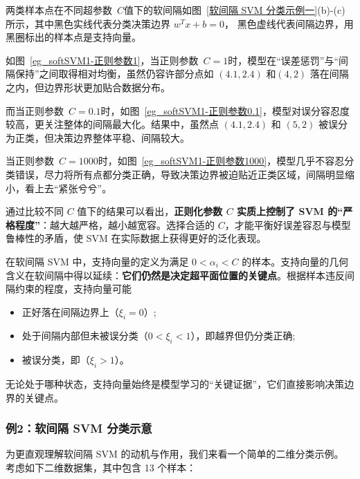 {两类样本点在不同超参数~$C$值下的软间隔如图~\ref{软间隔 SVM 分类示例一}(b)-(c)所示，其中黑色实线代表分类决策边界 $w^T x + b = 0$， 黑色虚线代表间隔边界，用黑圈标出的样本点是支持向量。

如图~\ref{eg_softSVM1-正则参数1}，当正则参数~$C=1$时，模型在“误差惩罚”与“间隔保持”之间取得相对均衡，虽然仍容许部分点如 $(4.1, 2.4)$ 和$(4, 2)$ 落在间隔之内，但边界形状更加贴合数据分布。
    
而当正则参数~$C=0.1$时，如图~\ref{eg_softSVM1-正则参数0.1}，模型对误分容忍度较高，更关注整体的间隔最大化。结果中，虽然点 $(4.1, 2.4)$ 和 $(5, 2)$ 被误分为正类，但决策边界整体平稳、间隔较大。

当正则参数~$C=1000$时，如图~\ref{eg_softSVM1-正则参数1000}，模型几乎不容忍分类错误，尽力将所有点都分类正确，导致决策边界被迫贴近正类区域，间隔明显缩小，看上去“紧张兮兮”。

通过比较不同 $C$ 值下的结果可以看出，\textbf{正则化参数 $C$ 实质上控制了 SVM 的“严格程度”}：越大越严格，越小越宽容。选择合适的 $C$，才能平衡好误差容忍与模型鲁棒性的矛盾，使 SVM 在实际数据上获得更好的泛化表现。

在软间隔 SVM 中，支持向量的定义为满足 $0 < \alpha_i < C$ 的样本。支持向量的几何含义在软间隔中得以延续：\textbf{它们仍然是决定超平面位置的关键点}。根据样本违反间隔约束的程度，支持向量可能
\begin{itemize}
\item 正好落在间隔边界上（$\xi_i = 0$）; 
\item 处于间隔内部但未被误分类（$0 < \xi_i < 1$），即越界但仍分类正确;
\item 被误分类，即（$\xi_i > 1$）。
\end{itemize}

无论处于哪种状态，支持向量始终是模型学习的“关键证据”，它们直接影响决策边界的关键点。

\subsubsection*{例2：软间隔 SVM 分类示意 } 

为更直观理解软间隔 SVM 的动机与作用，我们来看一个简单的二维分类示例。
考虑如下二维数据集，其中包含 13 个样本：

}
